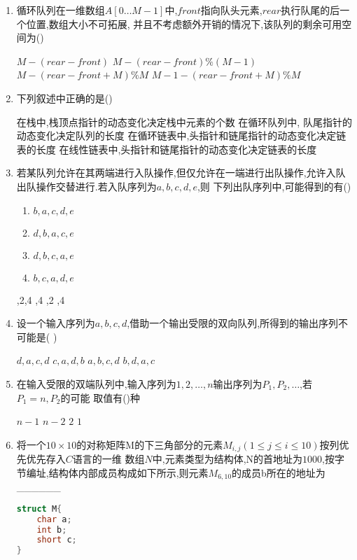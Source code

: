 \documentclass[12pt, a4paper, oneside, UTF8]{ctexbook}
\begin{document}
\begin{enumerate}
    \item 循环队列在一维数组$A[0\ldots M-1]$中,$front$指向队头元素,$rear$执行队尾的后一个位置,数组大小不可拓展,
    并且不考虑额外开销的情况下,该队列的剩余可用空间为()
    \begin{choices}[2]
        \task $M-(rear-front)$ \task $M-(rear-front)\%(M-1)$
        \task $M-(rear-front+M)\% M$ \task $M-1-(rear-front+M)\% M$
    \end{choices}

    \item 下列叙述中正确的是() 
    \begin{choices}[1]
        \task 在栈中,栈顶点指针的动态变化决定栈中元素的个数
        \task 在循环队列中, 队尾指针的动态变化决定队列的长度
        \task 在循环链表中,头指针和链尾指针的动态变化决定链表的长度
        \task 在线性链表中,头指针和链尾指针的动态变化决定链表的长度 
    \end{choices}

    \item 若某队列允许在其两端进行入队操作,但仅允许在一端进行出队操作,允许入队出队操作交替进行.若入队序列为$a,b,c,d,e$,则
    下列出队序列中,可能得到的有()
    \begin{enumerate}[label= (\arabic*)]
        \item $b,a,c,d,e$
        \item $d,b,a,c,e$
        \item $d,b,c,a,e$
        \item $b,c,a,d,e$
    \end{enumerate}
    \begin{choices}
        ,2,4 ,4 ,2 ,4
    \end{choices}

    \item 设一个输入序列为$a,b,c,d$,借助一个输出受限的双向队列,所得到的输出序列不可能是(   )
    \begin{choices}
        \task $d,a,c,d$ \task $c,a,d,b$ \task $a,b,c,d$ \task $b,d,a,c$
    \end{choices}

    \item 在输入受限的双端队列中,输入序列为$1,2,\ldots,n$输出序列为$P_1,P_2,\ldots$,若$P_1=n,P_2$的可能
    取值有()种 
    \begin{choices}
        \task $n-1$ \task $n-2$ \task $2$ \task $1$
    \end{choices}

    \item 将一个$10\times 10$的对称矩阵M的下三角部分的元素$M_{i,j}(1\leq j \leq i \leq 10)$按列优先优先存入$C$语言的一维
    数组$N$中,元素类型为结构体,N的首地址为$1000$,按字节编址,结构体内部成员构成如下所示,则元素$M_{6,10}$的成员b所在的地址为\_\_\_\_\_\_
    \begin{lstlisting}[language=C]
struct M{
    char a;
    int b;
    short c;
}
    \end{lstlisting}


\end{enumerate}
\end{document}
